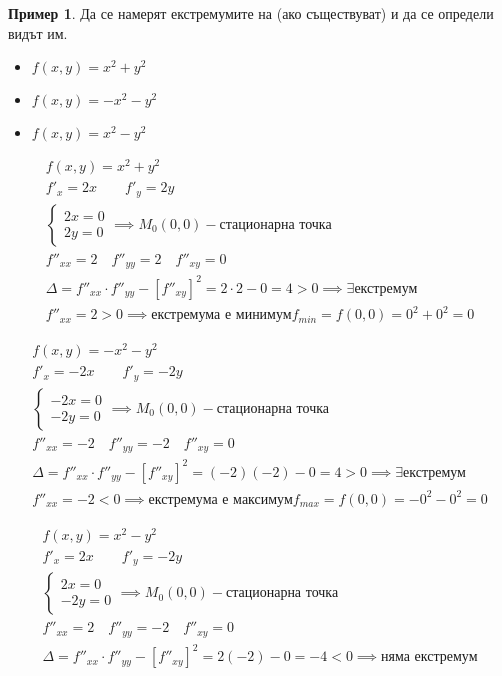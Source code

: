 \documentclass[a4paper,fleqn,12pt]{article}
\theoremstyle{definition}
\newtheorem{example}{Пример}[subsection]
\begin{document}
\begin{example}
Да се намерят екстремумите на (ако съществуват) и да се определи видът им. 
\begin{itemize}
\item $f(x,y) = x^2 + y^2$
\item $f(x,y) = -x^2 - y^2$
\item $f(x,y) = x^2 - y^2$
\end{itemize}
\begin{gather*}
f(x,y) = x^2 + y^2\\
f'_x = 2x \qquad f'_y = 2y\\ 
\begin{cases}
2x = 0\\ 
2y = 0
\end{cases} \implies M_0 (0,0) - \text{стационарна точка} \\
f''_{xx} = 2 \quad f''_{yy} = 2 \quad f''_{xy} = 0 \\
\Delta = f''_{xx} \cdot f''_{yy} - \left[ f''_{xy} \right]^2 = 2 \cdot 2 - 0 = 4 >0 \implies \exists \text{екстремум}\\
f''_{xx} = 2 > 0 \implies \text{екстремума е минимум}
f_{min} = f(0,0) = 0^2 + 0^2 = 0 
\end{gather*}

\begin{gather*}
f(x,y) = -x^2 - y^2\\
f'_x = -2x \qquad f'_y = -2y\\ 
\begin{cases}
-2x = 0\\ 
-2y = 0
\end{cases} \implies M_0 (0,0) - \text{стационарна точка} \\
f''_{xx} = -2 \quad f''_{yy} = -2 \quad f''_{xy} = 0 \\
\Delta = f''_{xx} \cdot f''_{yy} - \left[ f''_{xy} \right]^2 = (-2)(-2) - 0 = 4 >0 \implies \exists \text{екстремум}\\
f''_{xx} = -2 < 0 \implies \text{екстремума е максимум}
f_{max} = f(0,0) = -0^2 - 0^2 = 0 
\end{gather*}

\begin{gather*}
f(x,y) = x^2 - y^2\\
f'_x = 2x \qquad f'_y = -2y\\ 
\begin{cases}
2x = 0\\ 
-2y = 0
\end{cases} \implies M_0 (0,0) - \text{стационарна точка} \\
f''_{xx} = 2 \quad f''_{yy} = -2 \quad f''_{xy} = 0 \\
\Delta = f''_{xx} \cdot f''_{yy} - \left[ f''_{xy} \right]^2 = 2(-2) - 0 = -4 < 0 \implies \text{няма екстремум}\\ 
\end{gather*}
\end{example}
\end{document}
